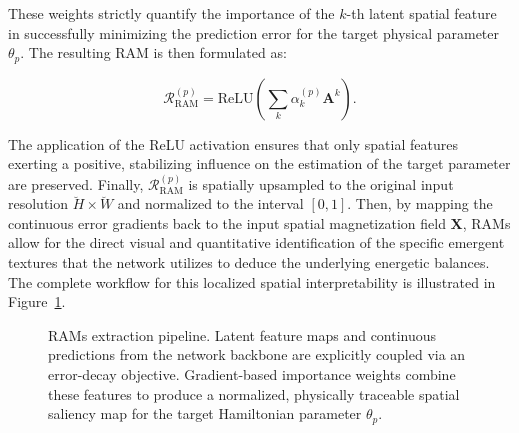 \documentclass[a4paper,fleqn]{cas-sc}
\begin{document}
These weights strictly quantify the importance of the $k$-th latent spatial feature in successfully minimizing the prediction error for the target physical parameter $\theta_p$. The resulting RAM is then formulated as:

\begin{equation}\label{eq:RAM_Formulation}
\mathbf{\mathcal{R}}_{\text{RAM}}^{(p)} = \text{ReLU} \left( \sum_k \alpha_k^{(p)} \mathbf{A}^k \right).
\end{equation}

The application of the ReLU activation ensures that only spatial features exerting a positive, stabilizing influence on the estimation of the target parameter are preserved. Finally, $\mathcal{R}_{\text{RAM}}^{(p)}$ is spatially upsampled to the original input resolution $\breve{H} \times \breve{W}$ and normalized to the interval $[0,1]$. Then, by mapping the continuous error gradients back to the input spatial magnetization field $\mathbf{X}$, RAMs allow for the direct visual and quantitative identification of the specific emergent textures that the network utilizes to deduce the underlying energetic balances. The complete workflow for this localized spatial interpretability is illustrated in Figure~\ref{fig:rams_pipeline}.


\begin{figure}[pos=htbp]
  \centering
  \vspace{0.3cm}
  \resizebox{0.65\linewidth}{!}{
  
  }
  \caption{RAMs extraction pipeline. Latent feature maps and continuous predictions from the network backbone are explicitly coupled via an error-decay objective. Gradient-based importance weights combine these features to produce a normalized, physically traceable spatial saliency map for the target Hamiltonian parameter $\theta_{p}$.}
  \label{fig:rams_pipeline}
\end{figure}
\end{document}
